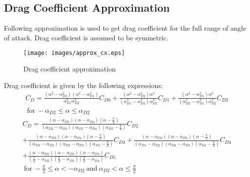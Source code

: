 \subsection{Drag Coefficient Approximation}

Following approximation is used to get drag coefficient for the full range of angle of attack. \cite{NASA-TM-102267} Drag coefficient is assumed to be symmetric.

\begin{figure}[h!]
  \centering
  \texttt{[image: images/approx\_cx.eps]}
  \caption{Drag coefficient approximation}
\end{figure}

Drag coefficient is given by the following expressions:
\begin{multline}
  C_D =
  \frac{
    \left( \alpha^2 - \alpha_{D2}^2 \right)
    \left( \alpha^2 - \alpha_{D1}^2 \right)
  }
  {
    \alpha_{D1}^2 \alpha_{D2}^2
  } C_{D0}
  +
  \frac{
    \left( \alpha^2 - \alpha_{D2}^2 \right) \alpha^2
  }
  {
    \left( \alpha_{D1}^2 - \alpha_{D2}^2 \right) \alpha_{D1}^2
  } C_{D1}
  +
  \frac{
    \left( \alpha^2 - \alpha_{D1}^2 \right) \alpha^2
  }
  {
    \left( \alpha_{D2}^2 - \alpha_{D1}^2 \right) \alpha_{D2}^2
  } C_{D2} \\
  \mathrm{~for~} -\alpha_{D2} \leq \alpha \leq \alpha_{D2}
\end{multline}
\begin{multline}
  C_D =
  \frac{
    \left( \alpha - \alpha_{D3} \right)
    \left( \alpha - \alpha_{D4} \right)
    \left( \alpha - \frac{\pi}{2} \right)
  }
  {
    \left( \alpha_{D2} - \alpha_{D3} \right)
    \left( \alpha_{D2} - \alpha_{D4} \right)
    \left( \alpha_{D2} - \frac{\pi}{2} \right)
  } C_{D2}
  \\
  +
  \frac{
    \left( \alpha - \alpha_{D2} \right)
    \left( \alpha - \alpha_{D4} \right)
    \left( \alpha - \frac{\pi}{2} \right)
  }
  {
    \left( \alpha_{D3} - \alpha_{D2} \right)
    \left( \alpha_{D3} - \alpha_{D4} \right)
    \left( \alpha_{D3} - \frac{\pi}{2} \right)
  } C_{D3}
  +
  \frac{
    \left( \alpha - \alpha_{D2} \right)
    \left( \alpha - \alpha_{D3} \right)
    \left( \alpha - \frac{\pi}{2} \right)
  }
  {
    \left( \alpha_{D4} - \alpha_{D2} \right)
    \left( \alpha_{D4} - \alpha_{D3} \right)
    \left( \alpha_{D4} - \frac{\pi}{2} \right)
  } C_{D4}
  \\
  +
  \frac{
    \left( \alpha - \alpha_{D2} \right)
    \left( \alpha - \alpha_{D3} \right)
    \left( \alpha - \alpha_{D4} \right)
  }
  {
    \left( \frac{\pi}{2} - \alpha_{D2} \right)
    \left( \frac{\pi}{2} - \alpha_{D3} \right)
    \left( \frac{\pi}{2} - \alpha_{D4} \right)
  } C_{D5}
  \\
  \mathrm{~for~} -\frac{\pi}{2} \leq \alpha < -\alpha_{D2}
  \mathrm{~and~} \alpha_{D2} < \alpha \leq \frac{\pi}{2}
\end{multline}

